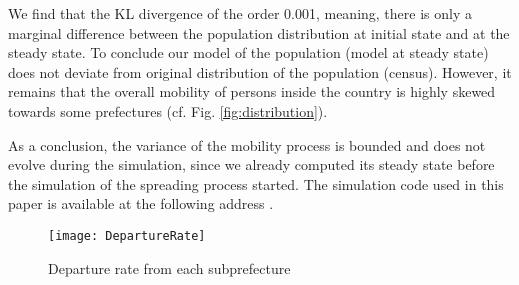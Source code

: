 \documentclass[review]{elsarticle}
\begin{document}
We find that the KL divergence of the order 0.001, meaning, there is only a marginal difference between the population distribution at initial state and at the steady state. To conclude our model of the population (model at steady state) does not deviate from original distribution of the population (census). However, it remains that the overall mobility of persons inside the country is highly skewed towards some prefectures (cf. Fig. \ref{fig:distribution}).

As a conclusion, the variance of the mobility process is bounded and does not evolve during the simulation, since we already computed its steady state before the simulation of the spreading process started. The simulation code used in this paper is available at the following address \cite{code}.

\begin{figure*}
    \centering
    \texttt{[image: DepartureRate]}
    \caption{Departure rate from each subprefecture}
    \label{fig:departurerate}
\end{figure*}


\end{document}

